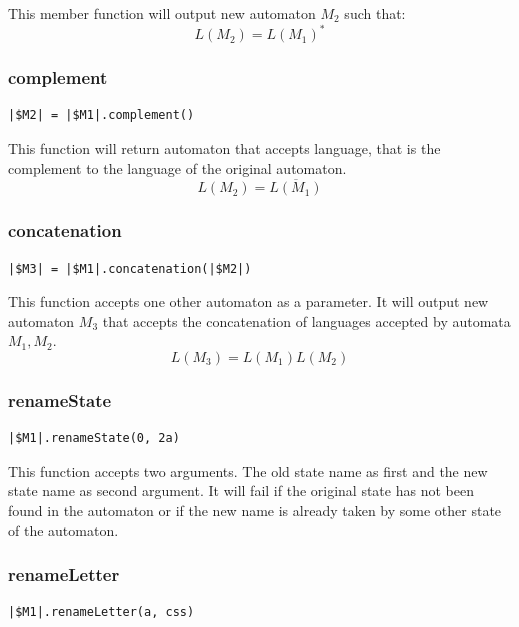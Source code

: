 \documentclass{ctuthesis}
\begin{document}
This member function will output new automaton $M_2$ such that:
\begin{equation*}
	L(M_2) = L(M_1)^*
\end{equation*}

\subsubsection{complement}
\begin{lstlisting}[language = JASL_snippet]
	|$M2| = |$M1|.complement()
\end{lstlisting}

This function will return automaton that accepts language, that is the complement to the language of the original automaton.
\begin{equation*}
	L(M_2) = \overline{L(M_1)}
\end{equation*}

\subsubsection{concatenation}
\begin{lstlisting}[language = JASL_snippet]
	|$M3| = |$M1|.concatenation(|$M2|)
\end{lstlisting}

This function accepts one other automaton as a parameter. It will output new automaton $M_3$ that accepts the concatenation of languages accepted by automata $M_1, M_2$.
\begin{equation*}
	L(M_3) = L(M_1)L(M_2)
\end{equation*}


\subsubsection{renameState}
\begin{lstlisting}[language = JASL_snippet]
	|$M1|.renameState(0, 2a)
\end{lstlisting}

This function accepts two arguments. The old state name as first and the new state name as second argument. It will fail if the original state has not been found in the automaton or if the new name is already taken by some other state of the automaton.


\subsubsection{renameLetter}
 \begin{lstlisting}[language = JASL_snippet]
	|$M1|.renameLetter(a, css)
\end{lstlisting}
\end{document}
